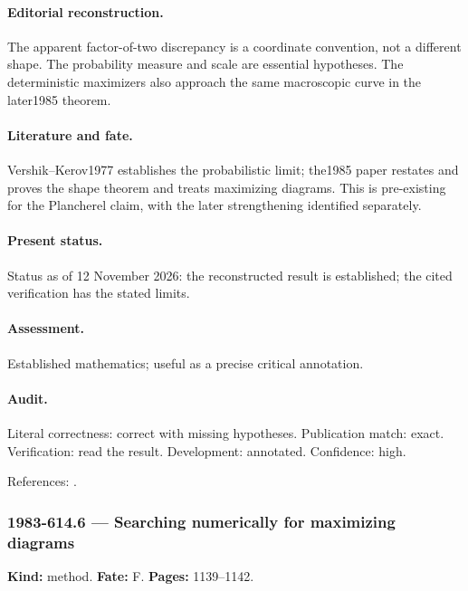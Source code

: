 \paragraph{Editorial reconstruction.} The apparent factor-of-two discrepancy is a coordinate convention, not a different shape. The probability measure and scale are essential hypotheses. The deterministic maximizers also approach the same macroscopic curve in the later1985 theorem.

\paragraph{Literature and fate.} Vershik--Kerov1977 establishes the probabilistic limit; the1985 paper restates and proves the shape theorem and treats maximizing diagrams. This is pre-existing for the Plancherel claim, with the later strengthening identified separately.

\paragraph{Present status.} Status as of 12 November 2026: the reconstructed result is established; the cited verification has the stated limits.

\paragraph{Assessment.} Established mathematics; useful as a precise critical annotation.

\paragraph{Audit.} Literal correctness: correct with missing hypotheses. Publication match: exact. Verification: read the result. Development: annotated. Confidence: high.

\noindent References: \citep{vershikkerov1977asymptotics,vershikkerov1985dimensions}.\par

\subsubsection{1983-614.6 --- Searching numerically for maximizing diagrams}

\label{item:1983-614.6}

\noindent\textbf{Kind:} method. \textbf{Fate:} F. \textbf{Pages:} 1139--1142.\par

